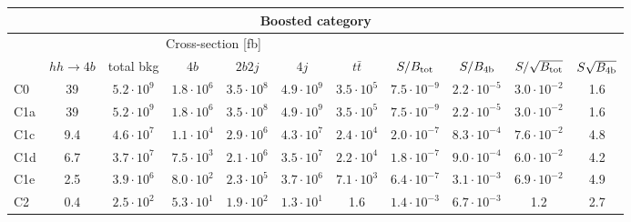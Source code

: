 \begin{tabular}{|l|cc|cccc|cccc|}
  \hline
\multicolumn{11}{|c|}{Boosted category}\\
\hline
&  \multicolumn{6}{c|}{Cross-section [fb]} &  &  & &  \\
   &  $hh\to 4b$ &  total bkg  &   $4b$    &  $2b2j$   &   $4j$    &
$t\bar{t}$ &
$S/B_{\rm tot}$ & $S/B_{\rm 4b}$ & $S/\sqrt{B_{\rm tot}}$ & $S\sqrt{B_{\rm 4b}}$ \\
  \hline
  \hline
C0      & 39  &   $5.2\cdot 10^9$   & $1.8\cdot 10^6$ & $3.5\cdot 10^8$ & $4.9\cdot 10^9$ & $3.5\cdot 10^5$  &   $7.5\cdot 10^{-9}$   & $2.2\cdot 10^{-5}$  &  $ 3.0\cdot 10^{-2}$   & 1.6 \\
 C1a     & 39  &   $5.2\cdot 10^9$   & $1.8\cdot 10^6$ & $3.5\cdot 10^8$ & $4.9\cdot 10^9$ & $3.5\cdot 10^5$  &   $7.5\cdot 10^{-9}$   & $2.2\cdot 10^{-5}$ &  $ 3.0\cdot 10^{-2}$   & 1.6  \\
 C1c     & 9.4  &   $4.6\cdot 10^7$   & $1.1\cdot 10^4$ & $2.9\cdot 10^6$ & $4.3\cdot 10^7$ & $2.4\cdot 10^4$ &   $2.0\cdot 10^{-7}$   & $8.3\cdot 10^{-4}$ &  $ 7.6\cdot 10^{-2}$   & 4.8 \\
 C1d     & 6.7  &   $3.7\cdot 10^7$   & $7.5\cdot 10^3$ & $2.1\cdot 10^6$ & $3.5\cdot 10^7$ & $2.2\cdot 10^4$ &   $1.8\cdot 10^{-7}$   & $9.0\cdot 10^{-4}$ &  $ 6.0\cdot 10^{-2}$   & 4.2  \\
 C1e     & 2.5  &   $3.9\cdot 10^6$   & $8.0\cdot 10^2$ & $2.3\cdot 10^5$ & $3.7\cdot 10^6$ & $7.1\cdot 10^3$   &   $6.4\cdot 10^{-7}$   & $3.1\cdot 10^{-3}$ &  $ 6.9\cdot 10^{-2}$   & 4.9\\
 C2      & 0.4  &   $2.5\cdot 10^2$   & $5.3\cdot 10^1$ & $1.9\cdot 10^2$ & $1.3\cdot 10^1$ & 1.6  &   $1.4\cdot 10^{-3}$   & $6.7\cdot 10^{-3}$ &   1.2   & 2.7  \\
\hline
\end{tabular}
